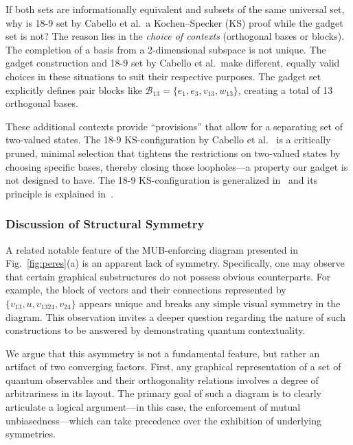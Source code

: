 \documentclass[%
  reprint,
  superscriptaddress,
  showpacs,
  showkeys,
  amsmath,amssymb,
  pra,
  longbibliography,
  floatfix,
  x11names
]{revtex4-2}
\begin{document}
If both sets are informationally equivalent and subsets of the same universal set, why is 18-9 set  by Cabello et al.\ a Kochen--Specker (KS) proof
while the gadget set is not? The reason lies in the \textit{choice of contexts} (orthogonal bases or blocks).
The completion of a basis from a 2-dimensional subspace is not unique.
The gadget construction and 18-9 set  by Cabello et al.\ make different, equally valid choices in these situations to suit their respective purposes.
The gadget set explicitly defines pair blocks like $\mathcal{B}_{13}=\{e_1, e_3, v_{13}, w_{13}\}$,
creating a total of 13 orthogonal bases.

These additional contexts provide ``provisions'' that allow for a separating set of two-valued states.
The 18-9 KS-configuration by Cabello et al.~\cite{cabello-1994} is a critically pruned,
minimal selection that tightens the restrictions on two-valued states by choosing specific bases,
thereby closing those loopholes---a property our gadget is not designed to have.
The 18-9 KS-configuration is generalized in~\cite{HardingJagerSmith2005IJTP} and its principle is explained in~\cite{Navara:AIP09}.

\subsubsection{Discussion of Structural Symmetry}

A related notable feature of the MUB-enforcing diagram presented in Fig.~\ref{fig:peres}(a) is an apparent lack of symmetry.
Specifically, one may observe that certain graphical substructures do not possess obvious counterparts.
For example, the block of vectors and their connections represented by $\{v_{13},u,v_{1324},v_{24}\}$ appears unique and breaks any simple visual symmetry in the diagram.
This observation invites a deeper question regarding the nature of such constructions to be answered by demonstrating quantum contextuality.

We argue that this asymmetry is not a fundamental feature, but rather an artifact of two converging factors.
First, any graphical representation of a set of quantum observables and their orthogonality relations involves a degree of arbitrariness in its layout.
The primary goal of such a diagram is to clearly articulate a logical argument---in this case, the enforcement of mutual unbiasedness---which can take precedence over the exhibition of underlying symmetries.
\end{document}
